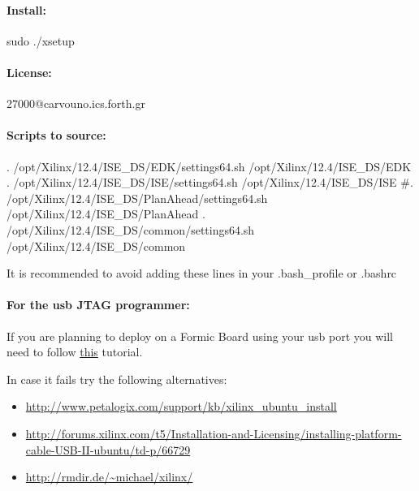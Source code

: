 \documentclass[
a4paper,
12pt,
]{report}
\begin{document}
\paragraph{Install:}
\begin{bash}
sudo ./xsetup
\end{bash}

\paragraph{License:} 27000@carvouno.ics.forth.gr

\paragraph{Scripts to source:}
\begin{bash}
. /opt/Xilinx/12.4/ISE_DS/EDK/settings64.sh /opt/Xilinx/12.4/ISE_DS/EDK
. /opt/Xilinx/12.4/ISE_DS/ISE/settings64.sh /opt/Xilinx/12.4/ISE_DS/ISE
#. /opt/Xilinx/12.4/ISE_DS/PlanAhead/settings64.sh /opt/Xilinx/12.4/ISE_DS/PlanAhead
. /opt/Xilinx/12.4/ISE_DS/common/settings64.sh /opt/Xilinx/12.4/ISE_DS/common
\end{bash}

It is recommended to avoid adding these lines in your .bash\_profile or
.bashrc

\paragraph{For the usb JTAG programmer:}
If you are planning to deploy on a Formic Board using your usb port
you will need to follow
\href{http://www.george-smart.co.uk/wiki/Xilinx_JTAG_Linux}{this}
tutorial.


In case it fails try the following alternatives:
\begin{itemize}
\item \url{http://www.petalogix.com/support/kb/xilinx_ubuntu_install}
\item \url{http://forums.xilinx.com/t5/Installation-and-Licensing/installing-platform-cable-USB-II-ubuntu/td-p/66729}
\item \url{http://rmdir.de/~michael/xilinx/}
\end{itemize}
\end{document}
